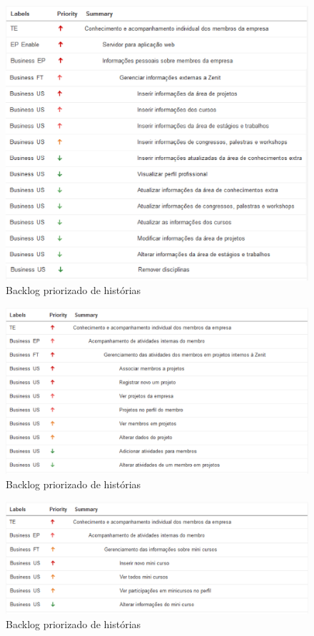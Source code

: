 \begin{figure}[H]
    \centering
    \includegraphics[keepaspectratio=true,scale=0.6]{figuras/blus04.eps}
    \caption[Backlog história]{Backlog priorizado de histórias\label{backlogus04}}
\end{figure}

\begin{figure}[H]
    \centering
    \includegraphics[keepaspectratio=true,scale=0.6]{figuras/blus05.eps}
    \caption[Backlog história]{Backlog priorizado de histórias\label{backlogus05}}
\end{figure}

\begin{figure}[H]
    \centering
    \includegraphics[keepaspectratio=true,scale=0.6]{figuras/blus06.eps}
    \caption[Backlog história]{Backlog priorizado de histórias\label{backlogus06}}
\end{figure}

